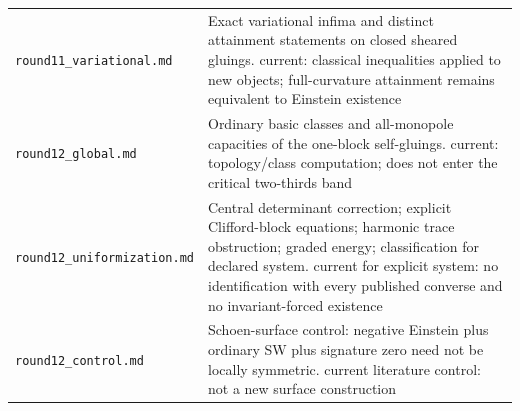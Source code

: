 \documentclass[UTF8,fontset=fandol,zihao=-4]{ctexart}
\theoremstyle{cn}
\begin{document}
\begin{longtable}{L{.34\textwidth}L{.59\textwidth}}
\nolinkurl{round11_variational.md} & Exact variational infima and distinct attainment statements on closed sheared gluings. current: classical inequalities applied to new objects; full-curvature attainment remains equivalent to Einstein existence\\
\nolinkurl{round12_global.md} & Ordinary basic classes and all-monopole capacities of the one-block self-gluings. current: topology/class computation; does not enter the critical two-thirds band\\
\nolinkurl{round12_uniformization.md} & Central determinant correction; explicit Clifford-block equations; harmonic trace obstruction; graded energy; classification for declared system. current for explicit system: no identification with every published converse and no invariant-forced existence\\
\nolinkurl{round12_control.md} & Schoen-surface control: negative Einstein plus ordinary SW plus signature zero need not be locally symmetric. current literature control: not a new surface construction\\
\bottomrule\end{longtable}\normalsize
\end{document}
